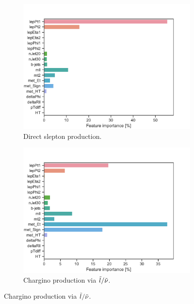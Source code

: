 \begin{figure}[H]
    \centering
    \begin{subfigure}[t!]{0.49\textwidth}
        \includegraphics[width = \textwidth]{Figures/SlepSlep/ML/BDT/All_level/High/featureImportance.pdf}
        \caption{Direct slepton production.}
        \label{fig:featSlepslepHigh}
    \end{subfigure}
    \begin{subfigure}[t!]{0.49\textwidth}
        \includegraphics[width = \textwidth]{Figures/SlepSnu/BDT/All_level/High/featureImportance.pdf}
        \caption{Chargino production via $\Tilde{l}/\Tilde{\nu}$.}
        \label{fig:featSlepsnuHigh}
    \end{subfigure}

\end{figure}
